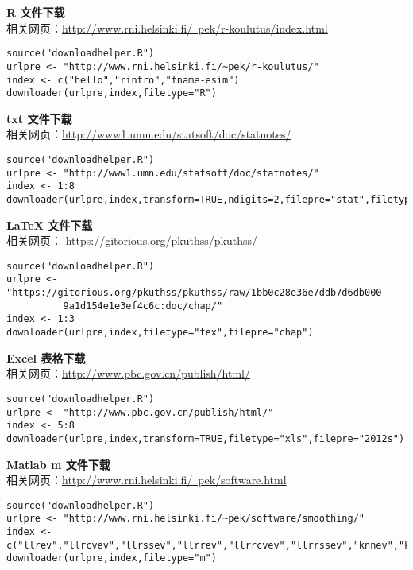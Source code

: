 \documentclass{article}
\begin{document}
\noindent\textbf{R 文件下载}\\
相关网页：\href{http://www.rni.helsinki.fi/~pek/r-koulutus/index.html}{http://www.rni.helsinki.fi/~pek/r-koulutus/index.html}

\begin{lstlisting}
source("downloadhelper.R")
urlpre <- "http://www.rni.helsinki.fi/~pek/r-koulutus/"
index <- c("hello","rintro","fname-esim")
downloader(urlpre,index,filetype="R")
\end{lstlisting}

\noindent\textbf{txt 文件下载}\\
相关网页：\href{http://www1.umn.edu/statsoft/doc/statnotes/}{http://www1.umn.edu/statsoft/doc/statnotes/}

\begin{lstlisting}
source("downloadhelper.R")
urlpre <- "http://www1.umn.edu/statsoft/doc/statnotes/"
index <- 1:8
downloader(urlpre,index,transform=TRUE,ndigits=2,filepre="stat",filetype="txt")
\end{lstlisting}

\noindent\textbf{\LaTeX{} 文件下载}\\
相关网页： \href{https://gitorious.org/pkuthss/pkuthss/source/1bb0c28e36e7ddb7d6db0009a1d154e1e3ef4c6c:doc/chap}{https://gitorious.org/pkuthss/pkuthss/}

\begin{lstlisting}
source("downloadhelper.R")
urlpre <- "https://gitorious.org/pkuthss/pkuthss/raw/1bb0c28e36e7ddb7d6db000
          9a1d154e1e3ef4c6c:doc/chap/"
index <- 1:3
downloader(urlpre,index,filetype="tex",filepre="chap")
\end{lstlisting}

\noindent\textbf{Excel 表格下载}\\
相关网页：\href{http://www.pbc.gov.cn/publish/html/kuangjia.htm?id=2012s07.htm}{http://www.pbc.gov.cn/publish/html/}
\begin{lstlisting}
source("downloadhelper.R")
urlpre <- "http://www.pbc.gov.cn/publish/html/"
index <- 5:8
downloader(urlpre,index,transform=TRUE,filetype="xls",filepre="2012s")
\end{lstlisting}

\noindent\textbf{Matlab m 文件下载}\\
相关网页：\href{http://www.rni.helsinki.fi/~pek/software.html}{http://www.rni.helsinki.fi/~pek/software.html}

\begin{lstlisting}
source("downloadhelper.R")
urlpre <- "http://www.rni.helsinki.fi/~pek/software/smoothing/"
index <- c("llrev","llrcvev","llrssev","llrrev","llrrcvev","llrrssev","knnev","knncvev","knnssev","demo")
downloader(urlpre,index,filetype="m")
\end{lstlisting}
\end{document}
